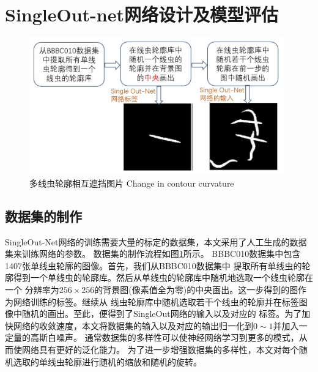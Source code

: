 \section{SingleOut-net网络设计及模型评估}
	\begin{figure}[htb]
	  \centering
	  \includegraphics[width=11cm]{figure/chap4/dataset.jpg}
	  \bicaption
		{多线虫轮廓相互遮挡图片}
		{Change in contour curvature}
	  \label{fig:chap4:dataset}
	\end{figure}
\subsection{数据集的制作}
\label{dataset}
	SingleOut-Net网络的训练需要大量的标定的数据集，本文采用了人工生成的数据集来训练网络的参数。
	数据集的制作流程如图\ref{fig:chap4:dataset}所示。
	BBBC010数据集\cite{Ljosa2012Annotated}中包含1407张单线虫轮廓的图像。首先，我们从BBBC010数据集中
	提取所有单线虫的轮廓得到一个单线虫的轮廓库。然后从单线虫的轮廓库中随机地选取一个线虫轮廓在一个
	分辨率为$256\times256$的背景图(像素值全为零)的中央画出。这一步得到的图作为网络训练的标签。继续从
	线虫轮廓库中随机选取若干个线虫的轮廓并在标签图像中随机的画出。至此，便得到了SingleOut网络的输入以及对应的
	标签。为了加快网络的收敛速度，本文将数据集的输入以及对应的输出归一化到$0\sim1$并加入一定量的高斯白噪声。
	通常数据集的多样性可以使神经网络学习到更多的模式，从而使网络具有更好的泛化能力。
	为了进一步增强数据集的多样性，本文对每个随机选取的单线虫轮廓进行随机的缩放和随机的旋转。


